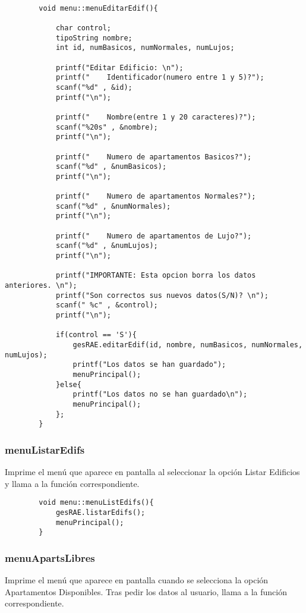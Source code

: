 \documentclass[12pt]{article}
\begin{document}
		\begin{lstlisting}
		
		void menu::menuEditarEdif(){
			
			char control;
			tipoString nombre;
			int id, numBasicos, numNormales, numLujos;
			
			printf("Editar Edificio: \n");
			printf("    Identificador(numero entre 1 y 5)?");
			scanf("%d" , &id);
			printf("\n");
			
			printf("    Nombre(entre 1 y 20 caracteres)?");
			scanf("%20s" , &nombre);
			printf("\n");
			
			printf("    Numero de apartamentos Basicos?");
			scanf("%d" , &numBasicos);
			printf("\n");
			
			printf("    Numero de apartamentos Normales?");
			scanf("%d" , &numNormales);
			printf("\n");
			
			printf("    Numero de apartamentos de Lujo?");
			scanf("%d" , &numLujos);
			printf("\n");
			
			printf("IMPORTANTE: Esta opcion borra los datos anteriores. \n");
			printf("Son correctos sus nuevos datos(S/N)? \n");
			scanf(" %c" , &control);
			printf("\n");
			
			if(control == 'S'){
				gesRAE.editarEdif(id, nombre, numBasicos, numNormales, numLujos);
				printf("Los datos se han guardado");
				menuPrincipal();
			}else{
				printf("Los datos no se han guardado\n");
				menuPrincipal();
			};
		}
		\end{lstlisting}
			
		\subsubsection{menuListarEdifs}
		Imprime el menú que aparece en pantalla al seleccionar la opción Listar Edificios y llama a la función correspondiente.
			
		\begin{lstlisting}
		void menu::menuListEdifs(){
			gesRAE.listarEdifs();
			menuPrincipal();
		}
		\end{lstlisting}
		
		\subsubsection{menuApartsLibres}
		Imprime el menú que aparece en pantalla cuando se selecciona la opción Apartamentos Disponibles. Tras pedir los datos al usuario, llama a la función correspondiente.
		
\end{document}
